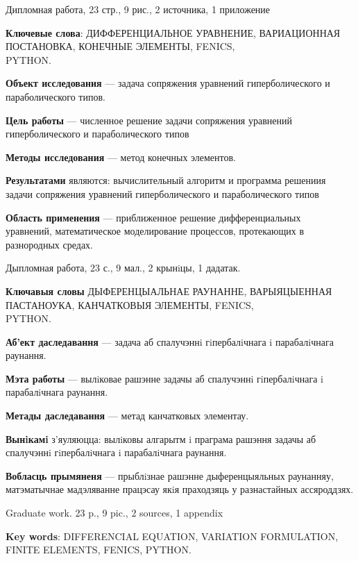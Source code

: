 \pagestyle{plain}
Дипломная работа, 23 стр., 9 рис., 2 источника, 1 приложение

\textbf{Ключевые слова}: ДИФФЕРЕНЦИАЛЬНОЕ УРАВНЕНИЕ, ВАРИАЦИОННАЯ ПОСТАНОВКА, 
КОНЕЧНЫЕ ЭЛЕМЕНТЫ, FENICS, \\ PYTHON.

\textbf{Объект исследования} --- задача сопряжения уравнений гиперболического и параболического типов.

\textbf{Цель работы} --- численное решение задачи сопряжения уравнений гиперболического и параболического типов

\textbf{Методы исследования} --- метод конечных элементов.

\textbf{Результатами} являются: вычислительный алгоритм и программа решениия задачи сопряжения
уравнений гиперболического и параболического типов

\textbf{Область применения} --- приближенное решение дифференциальных \\ уравнений, математическое
моделирование процессов, протекающих в разнородных средах.


Дыпломная работа, 23 с., 9 мал., 2 крынiцы, 1 дадатак.

\textbf{Ключавыя словы} ДЫФЕРЕНЦЫАЛЬНАЕ РАУНАННЕ, ВАРЫЯЦЫЕННАЯ ПАСТАНОУКА, КАНЧАТКОВЫЯ ЭЛЕМЕНТЫ,
FENICS, \\ PYTHON.

\textbf{Аб'ект даследавання} --- задача аб спалучэннi гiпербалiчнага i парабалiчнага раунання.

\textbf{Мэта работы} --- вылiковае рашэнне задачы аб спалучэннi гiпербалiчнага i парабалiчнага раунання.

\textbf{Метады даследавання} --- метад канчатковых элементау.

\textbf{Вынiкамi} з'яуляюцца: вылiковы алгарытм i праграма рашэння задачы аб спалучэннi гiпербалiчнага i парабалiчнага раунання.

\textbf{Вобласць прымяненя} --- прыблiзнае рашэнне дыференцыяльных раунанняу, матэматычнае
мадэляванне працэсау якiя праходзяць у разнастайных ассяроддзях. \\

\newpage


Graduate work. 23 p., 9 pic., 2 sources, 1 appendix

\textbf{Key words}: DIFFERENCIAL EQUATION, VARIATION FORMULATION,\\ FINITE ELEMENTS, FENICS, PYTHON.

